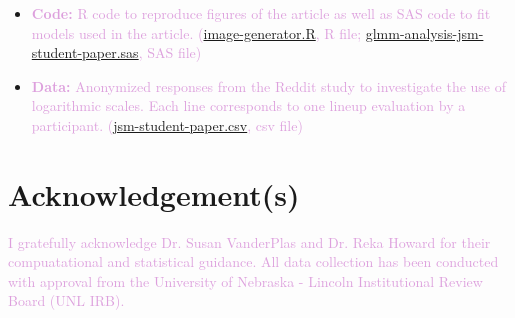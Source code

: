 \documentclass[]{interact}
\theoremstyle{plain}%
\theoremstyle{definition}
\theoremstyle{remark}
\begin{document}
\begin{itemize}
\item
  \textcolor{Plum}{\textbf{Code:} R code to reproduce figures of the article as well as SAS code to fit models used in the article. (\href{https://github.com/srvanderplas/Perception-of-Log-Scales/blob/master/manuscripts/jsm-2021-student-paper-submission/code/image-generator.R}{image-generator.R}, R file; \href{https://github.com/srvanderplas/Perception-of-Log-Scales/blob/master/lineups-pilot-analysis/sasCode/glmm-analysis-jsm-student-paper.sas}{glmm-analysis-jsm-student-paper.sas}, SAS file)}
\item
  \textcolor{Plum}{\textbf{Data:} Anonymized responses from the Reddit study to investigate the use of logarithmic scales. Each line corresponds to one lineup evaluation by a participant. (\href{https://github.com/srvanderplas/Perception-of-Log-Scales/blob/master/lineups-pilot-analysis/data/jsm-student-paper-11302020.csv}{jsm-student-paper.csv}, csv file)}
\end{itemize}

\hypertarget{acknowledgements}{%
\section*{Acknowledgement(s)}\label{acknowledgements}}

\textcolor{Plum}{I gratefully acknowledge Dr. Susan VanderPlas and Dr. Reka Howard for their compuatational and statistical guidance. All data collection has been conducted with approval from the University of Nebraska - Lincoln Institutional Review Board (UNL IRB).}



\end{document}
